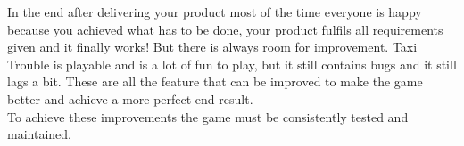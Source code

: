 In the end after delivering your product most of the time everyone is happy because you achieved what has to be done, your product fulfils all requirements given and it finally works! But there is always room for improvement. Taxi Trouble is playable and is a lot of fun to play, but it still contains bugs and it still lags a bit. These are all the feature that can be improved to make the game better and achieve a more perfect end result. \\
To achieve these improvements the game must be consistently tested and maintained. 
